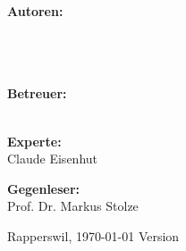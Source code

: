 \begin{titlepage}
\begin{center}
		\vfill
	\end{center}
	
		
	\begin{flushleft}
		\textbf{\LARGE Autoren:}\\
		\Large \rlif \\
		\Large \chuf \\
		\Large \fscf \\
		\vspace{0.7cm}
		
		\textbf{\LARGE Betreuer:}\\
		\Large \proff\\
		\vspace{0.5cm}
		
		\textbf{\LARGE Experte:}\\
		\Large Claude Eisenhut
		\vspace{0.5cm}

		\textbf{\LARGE Gegenleser:}\\
		\Large Prof. Dr. Markus Stolze
		\vspace{0.5cm}
		
		\vspace{1.5cm}
		 Rapperswil, \today
		\hfill
		Version \version
	\end{flushleft}

\end{titlepage}

\restoregeometry
